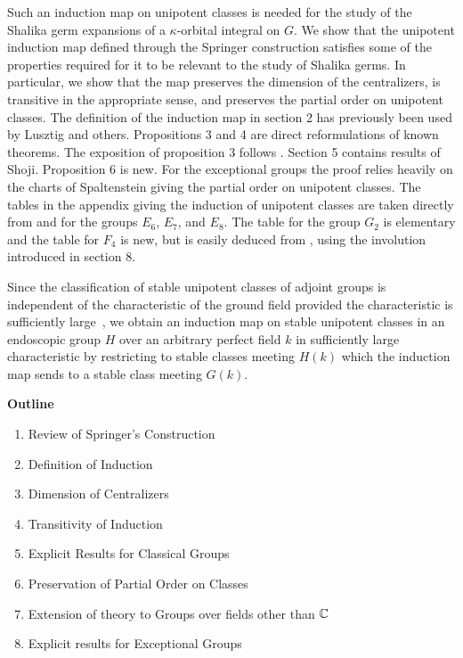 \documentclass{amsart}
\newcommand\C		{{\Bbb C}}
\begin{document}
Such an induction map on unipotent classes is needed for the
study of the
Shalika germ expansions of a $\kappa$-orbital integral on $G$. 
We show that 
the unipotent induction map defined through the Springer
construction satisfies
some of the properties required for it to be relevant to the
study of Shalika
germs.  In particular, we show that the map preserves the
dimension of the
centralizers, is transitive in the appropriate sense, and
preserves the 
partial order on unipotent classes.  
The definition of the induction map in section 2 has previously
been used by Lusztig and others.  Propositions 3 and 4 are direct
reformulations of known theorems.  The exposition of proposition
3 follows \cite{LS}.  Section 5 contains results of Shoji. 
Proposition 6 is new.  For the exceptional groups the proof
relies heavily on the charts of Spaltenstein giving the partial
order on unipotent classes.  The tables in the appendix giving
the induction of unipotent classes are taken directly from
\cite{AL} and \cite{A} for the groups $E_6$, $E_7$, and $E_8$. 
The table for the group $G_2$ is elementary and the table for
$F_4$ is new, but is easily deduced from \cite{A}, using the
involution introduced in section 8.

Since the classification of stable unipotent classes of adjoint
groups is 
independent of the
characteristic of the ground field provided the characteristic is
sufficiently
large~\cite{C}, we
obtain an induction map on stable unipotent classes in an
endoscopic group
$H$ over an arbitrary perfect field $k$ in sufficiently large
characteristic 
by restricting
to stable classes meeting $H(k)$ which the induction map sends to
a stable 
class meeting $G(k)$.


\centerline{\bf Outline}

\bigskip

\begin{enumerate}[label=\arabic*.]
\item Review of Springer's Construction
\item Definition of Induction
\item Dimension of Centralizers
\item Transitivity of Induction
\item Explicit Results for Classical
Groups
\item Preservation of Partial Order on
Classes
\item Extension of theory to Groups over fields
other than $\C$%
\item Explicit results for Exceptional
Groups
\end{enumerate}
\end{document}
